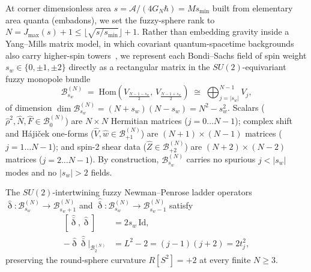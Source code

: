 \documentclass[onecolumn,11pt,aps,prd,amsmath,amssymb,nofootinbib,floatfix]{revtex4-2}
\newcommand{\scrA}{\mathscr{A}}
\newcommand{\calB}{\mathcal{B}}
\newcommand{\ethop}{\eth}
\newcommand{\bareth}{\bar{\eth}}
\begin{document}
At corner dimensionless area $s=\scrA/(4G_N\hbar)=M s_{\min}$ built from elementary area quanta (embadons), we set the fuzzy-sphere rank to $N=J_{\max}(s)+1\le\lfloor\sqrt{s/s_{\min}}\rfloor+1$. Rather than embedding gravity inside a Yang--Mills matrix model, in which covariant quantum-spacetime backgrounds also carry higher-spin towers~\cite{Steinacker2026}, we represent each Bondi--Sachs field of spin weight $s_w\in\{0,\pm 1,\pm 2\}$ directly as a rectangular matrix in the $SU(2)$-equivariant fuzzy monopole bundle
\begin{equation}\label{eq:fuzzy_bundle}
\calB_{s_w}^{(N)} \;=\; \mathrm{Hom}\!\left(V_{\frac{N-1-s_w}{2}},\, V_{\frac{N-1+s_w}{2}}\right) \;\cong\; \bigoplus_{j=|s_w|}^{N-1} V_j,
\end{equation}
of dimension $\dim\calB_{s_w}^{(N)}=(N+s_w)(N-s_w)=N^2-s_w^2$. Scalars ($\widehat{\rho}^2,\widehat{N},\widehat{F}\in\calB_0^{(N)}$) are $N\times N$ Hermitian matrices ($j=0\dots N-1$); complex shift and H\'aji\v{c}ek one-forms ($\widehat{V},\widehat{w}\in\calB_{+1}^{(N)}$) are $(N+1)\times(N-1)$ matrices ($j=1\dots N-1$); and spin-2 shear data ($\widehat{Z}\in\calB_{+2}^{(N)}$) are $(N+2)\times(N-2)$ matrices ($j=2\dots N-1$). By construction, $\calB_{s_w}^{(N)}$ carries no spurious $j<|s_w|$ modes and no $|s_w|>2$ fields.

The $SU(2)$-intertwining fuzzy Newman--Penrose ladder operators $\widehat{\ethop}:\calB_{s_w}^{(N)}\to\calB_{s_w+1}^{(N)}$ and $\widehat{\bareth}:\calB_{s_w}^{(N)}\to\calB_{s_w-1}^{(N)}$ satisfy
\begin{align}\label{eq:fuzzy_eth}
[\widehat{\bareth},\widehat{\ethop}] &= 2 s_w\,\mathrm{Id}, \nonumber\\
-\widehat{\ethop}\widehat{\bareth}\big|_{\calB_2^{(N)}} &= L^2 - 2 = (j-1)(j+2) = 2 t_j^2,
\end{align}
preserving the round-sphere curvature $R[S^2]=+2$ at every finite $N\ge 3$.
\end{document}
